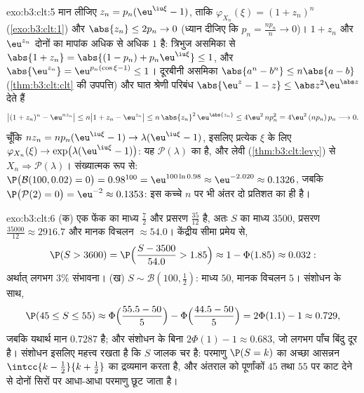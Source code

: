 \begin{solution}{exo:b3:clt:5}
मान लीजिए $z_n = p_n(\eu^{\iu\xi} - 1)$, ताकि
$\varphi_{X_n}(\xi) = (1 + z_n)^n$ (\cref{exo:b3:clt:1}) और
$\abs{z_n} \leq 2p_n \to 0$ (ध्यान दीजिए कि $p_n =
\frac{np_n}n \to 0$)। $1 + z_n$ और $\eu^{z_n}$ दोनों का
मापांक अधिक से अधिक $1$ है: त्रिभुज असमिका से $\abs{1 + z_n}
= \abs{(1 - p_n) + p_n\eu^{\iu\xi}} \leq 1$, और
$\abs{\eu^{z_n}} = \eu^{p_n(\cos\xi - 1)}
\leq 1$। दूरबीनी असमिका $\abs{a^n - b^n} \leq
n\abs{a - b}$ (\cref{thm:b3:clt:clt} की उपपत्ति) और घात
श्रेणी परिबंध $\abs{\eu^z - 1 - z} \leq
\abs z^2\eu^{\abs z}$ देते हैं
\[
\bigl|(1 + z_n)^n - \eu^{nz_n}\bigr| \leq n\bigl|1 + z_n -
\eu^{z_n}\bigr| \leq n\,\abs{z_n}^2\,\eu^{\abs{z_n}} \leq
4\eu^2\,np_n^2 = 4\eu^2\,(np_n)\,p_n \longrightarrow 0 .
\]
चूँकि $nz_n = np_n(\eu^{\iu\xi} - 1) \to
\lambda(\eu^{\iu\xi} - 1)$, इसलिए प्रत्येक $\xi$ के लिए
$\varphi_{X_n}(\xi)
\to \exp\bigl(\lambda(\eu^{\iu\xi} - 1)\bigr)$: यह $\mathcal
P(\lambda)$ का  है, और लेवी
(\cref{thm:b3:clt:levy}) से $X_n \Rightarrow \mathcal
P(\lambda)$। संख्यात्मक रूप से: $\P\bigl(\mathcal B(100,
0.02) = 0\bigr) = 0.98^{100} = \eu^{100\ln 0.98} \approx
\eu^{-2.020} \approx 0.1326$, जबकि $\P\bigl(\mathcal P(2) =
0\bigr) = \eu^{-2} \approx 0.1353$: इस कच्चे $n$ पर भी
अंतर दो प्रतिशत का ही है।
\end{solution}

\begin{solution}{exo:b3:clt:6}
(क) एक फेंक का माध्य $\frac72$ और प्रसरण
$\frac{35}{12}$ है, अतः $S$ का माध्य $3500$, प्रसरण
$\frac{35000}{12} \approx 2916.7$ और मानक विचलन
$\approx 54.0$। केंद्रीय सीमा प्रमेय से,
\[
\P(S > 3600) = \P\Bigl(\frac{S - 3500}{54.0} > 1.85\Bigr)
\approx 1 - \Phi(1.85) \approx 0.032 :
\]
अर्थात् लगभग $3\%$ संभावना।
(ख) $S \sim \mathcal B(100, \frac12)$: माध्य $50$, मानक
विचलन $5$।  संशोधन के साथ,
\[
\P(45 \leq S \leq 55) \approx
\Phi\Bigl(\frac{55.5 - 50}{5}\Bigr) -
\Phi\Bigl(\frac{44.5 - 50}{5}\Bigr) = 2\Phi(1.1) - 1
\approx 0.729,
\]
जबकि यथार्थ मान $0.7287$ है; और संशोधन के बिना
$2\Phi(1) - 1 \approx 0.683$, जो लगभग पाँच बिंदु दूर है।
संशोधन इसलिए महत्त्व रखता है कि $S$ जालक चर है: परमाणु $\P(S
= k)$ का अच्छा आसन्नन $\intcc{k - \frac12}{k + \frac12}$ का
 द्रव्यमान करता है, और अंतराल को पूर्णांकों $45$ तथा
$55$ पर काट देने से दोनों सिरों पर आधा-आधा परमाणु छूट जाता
है।
\end{solution}

